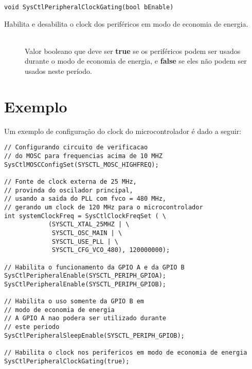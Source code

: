 \begin{lstlisting}[style=funcao]
	void SysCtlPeripheralClockGating(bool bEnable)
\end{lstlisting}

Habilita e desabilita o clock dos periféricos em modo de economia de energia.

\begin{description}
	\item []\hfill \\
	Valor booleano que deve ser \textbf{true} se os periféricos podem ser usados durante o modo de economia de energia, e \textbf{false} se eles não podem ser usados neste período.
	
\end{description}


\section{Exemplo}

Um exemplo de configuração do clock do microcontrolador é dado a seguir:

\begin{lstlisting}[style=citacao]
// Configurando circuito de verificacao 
// do MOSC para frequencias acima de 10 MHZ
SysCtlMOSCConfigSet(SYSCTL_MOSC_HIGHFREQ);

// Fonte de clock externa de 25 MHz,
// provinda do oscilador principal,
// usando a saida do PLL com fvco = 480 MHz,
// gerando um clock de 120 MHz para o microcontrolador
int systemClockFreq = SysCtlClockFreqSet ( \
			(SYSCTL_XTAL_25MHZ | \
			 SYSCTL_OSC_MAIN | \
			 SYSCTL_USE_PLL | \
			 SYSCTL_CFG_VCO_480), 120000000);

// Habilita o funcionamento da GPIO A e da GPIO B
SysCtlPeripheralEnable(SYSCTL_PERIPH_GPIOA);
SysCtlPeripheralEnable(SYSCTL_PERIPH_GPIOB);

// Habilita o uso somente da GPIO B em 
// modo de economia de energia
// A GPIO A nao podera ser utilizado durante 
// este periodo
SysCtlPeripheralSleepEnable(SYSCTL_PERIPH_GPIOB);

// Habilita o clock nos perifericos em modo de economia de energia
SysCtlPeripheralClockGating(true);

\end{lstlisting}

